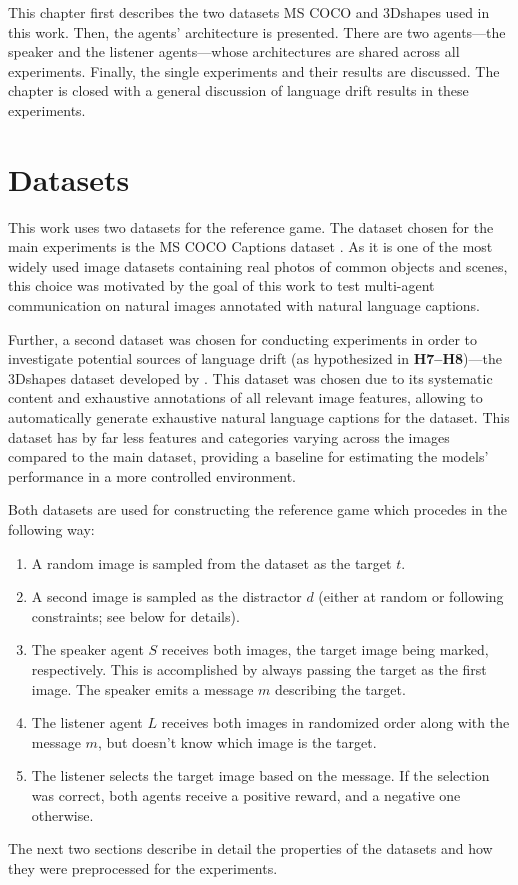 This chapter first describes the two datasets MS COCO and 3Dshapes used in this work. Then, the agents' architecture is presented. There are two agents---the speaker and the listener agents---whose architectures are shared across all experiments. Finally, the single experiments and their results are discussed. The chapter is closed with a general discussion of language drift results in these experiments.

\section{Datasets}

This work uses two datasets for the reference game. The dataset chosen for the main experiments is the MS COCO Captions dataset \parencite{chen2015microsoft}. As it is one of the most widely used image datasets containing real photos of common objects and scenes, this choice was motivated by the goal of this work to test multi-agent communication on natural images annotated with natural language captions. 

Further, a second dataset was chosen for conducting experiments in order to investigate potential sources of language drift (as hypothesized in \textbf{H7--H8})---the 3Dshapes dataset developed by \textcite{burgess20183d}. This dataset was chosen due to its systematic content and exhaustive annotations of all relevant image features, allowing to automatically generate exhaustive natural language captions for the dataset. This dataset has by far less features and categories varying across the images compared to the main dataset, providing a baseline for estimating the models' performance in a more controlled environment.

Both datasets are used for constructing the reference game which procedes in the following way:
\begin{enumerate}
	\item A random image is sampled from the dataset as the target $t$.
	\item A second image is sampled as the distractor $d$ (either at random or following constraints; see below for details).
	\item The speaker agent $S$ receives both images, the target image being marked, respectively. This is accomplished by always passing the target as the first image. The speaker emits a message $m$ describing the target.
	\item The listener agent $L$ receives both images in randomized order along with the message $m$, but doesn't know which image is the target.
	\item The listener selects the target image based on the message. If the selection was correct, both agents receive a positive reward, and a negative one otherwise.	 
\end{enumerate}
The next two sections describe in detail the properties of the datasets and how they were preprocessed for the experiments.

